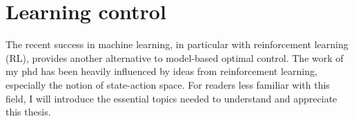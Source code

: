 
\section{Learning control}

The recent success in machine learning, in particular with reinforcement learning (RL), provides another alternative to model-based optimal control. The work of my phd has been heavily influenced by ideas from reinforcement learning, especially the notion of state-action space. For readers less familiar with this field, I will introduce the essential topics needed to understand and appreciate this thesis.

